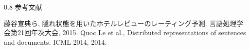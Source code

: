 \documentclass[unicode,10pt]{beamer}
\newlength{\mycolumnwidth}
\begin{document}
\begin{frame}
\begin{columns}[onlytextwidth,t]
\begin{column}{0.8\mycolumnwidth}
    参考文献
    
    \begin{thebibliography}{9}
        藤谷宣典ら,
        隠れ状態を用いたホテルレビューのレーティング予測.
        言語処理学会第21回年次大会, 2015.
        Quoc Le et al.,
        Distributed representations of sentences and documents.
        ICML 2014, 2014.
    \end{thebibliography}
  \end{column}
\end{columns}

\end{frame}
\end{document}
